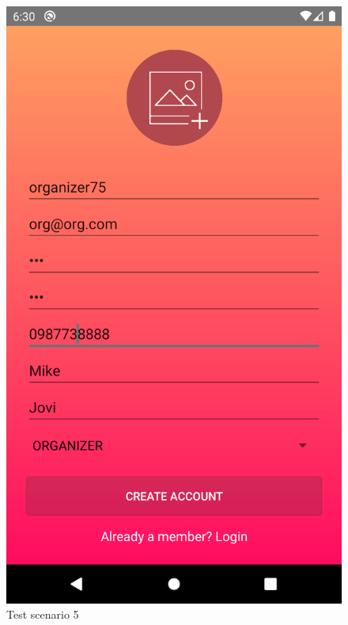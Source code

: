 			\begin{figure}[H]
				\includegraphics[width=\linewidth]{images/test_Screens/test_scenario_5-1.png}
				\caption{Test scenario 5}
				\label{fig:espresso_5_1}
			\end{figure}
			
